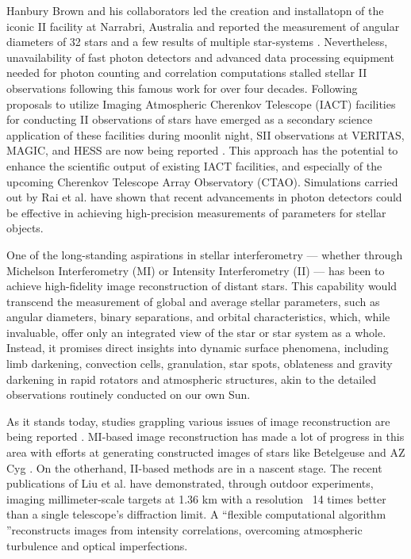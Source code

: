 Hanbury Brown and his collaborators led the creation and installatopn of the iconic II facility at Narrabri, Australia and reported the measurement of angular diameters of 32 stars and a few results of multiple star-systems \citep{hanbury1974angular}. Nevertheless,  unavailability of fast photon detectors and advanced data processing equipment needed for photon counting and correlation computations stalled stellar II observations following this famous work for over four decades. Following proposals to utilize Imaging Atmospheric Cherenkov Telescope (IACT) facilities for conducting II observations of stars have emerged\citep{LeBohec2006, nunez2010stellar, nunez2012high, 2013APh....43..331D} as a secondary science application of these facilities during moonlit night, SII observations at VERITAS, MAGIC, and HESS are now being reported \citep[e.g.,][]{2024ApJ...966...28A,2024MNRAS.529.4387A,2025MNRAS.537.2334V}. This approach has the potential to enhance the scientific output of existing IACT facilities, and especially of the upcoming Cherenkov Telescope Array Observatory (CTAO). Simulations carried out by Rai et al. \citep[e.g.,][]{10.1093/mnras/stab2391, 10.1093/mnras/stac2433} have shown that recent advancements in photon detectors could be effective in achieving high-precision measurements of parameters for stellar objects. 


One of the long-standing aspirations in stellar interferometry — whether through Michelson Interferometry (MI) or Intensity Interferometry (II) — has been to achieve high-fidelity image reconstruction of distant stars. This capability would transcend the measurement of global and average stellar parameters, such as angular diameters, binary separations, and orbital characteristics, which, while invaluable, offer only an integrated view of the star or star system as a whole. Instead, it promises direct insights into dynamic surface phenomena, including limb darkening, convection cells, granulation, star spots, oblateness and gravity darkening in rapid rotators and atmospheric structures, akin to the detailed observations routinely conducted on our own Sun.

As it stands today, studies grappling various issues of image reconstruction are being reported \citep{Haubois2009, Norris2021AZCyg, Liu2024SuperresolutionII, Liu2025}. MI-based image reconstruction has made a lot of progress in this area with efforts at generating constructed images of stars like Betelgeuse \citep{Haubois2009} and AZ Cyg \citep{Norris2021AZCyg}. On the otherhand, II-based methods are in a nascent stage. The recent publications of Liu et al. \cite{Liu2024SuperresolutionII, Liu2025} have demonstrated, through outdoor experiments, imaging millimeter-scale targets at 1.36 km with a resolution ~14 times better than a single telescope’s diffraction limit. A \textquotedblleft flexible computational algorithm \textquotedblright reconstructs images from intensity correlations, overcoming atmospheric turbulence and optical imperfections. 

